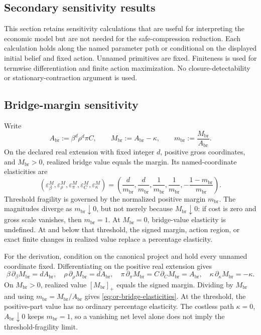 \subsection{Secondary sensitivity results}
\label{or:aor-secondary-comparative-statics}

This section retains sensitivity calculations that are useful for interpreting
the economic model but are not needed for the safe-compression reduction.
Each calculation holds along the named parameter path or conditional on the
displayed initial belief and fixed action. Unnamed primitives are fixed.
Finiteness is used for termwise differentiation and finite action
maximization. No closure-detectability or stationary-contraction argument is
used.

\subsection{Bridge-margin sensitivity}

Write
\begin{equation}
 A_{\mathrm{br}}:=\beta^d\rho^d\pi C,
 \qquad M_{\mathrm{br}}:=A_{\mathrm{br}}-\kappa,
 \qquad m_{\mathrm{br}}:=\frac{M_{\mathrm{br}}}{A_{\mathrm{br}}}.
 \label{eq:or-bridge-margin}
\end{equation}
On the declared real extension with fixed integer \(d\), positive gross
coordinates, and \(M_{\mathrm{br}}>0\), realized bridge value equals the
margin. Its named-coordinate elasticities are
\begin{equation}
 (\varepsilon_\beta^M,\varepsilon_\rho^M,
   \varepsilon_\pi^M,\varepsilon_C^M,\varepsilon_\kappa^M)
 =\left(\frac d{m_{\mathrm{br}}},\frac d{m_{\mathrm{br}}},
   \frac1{m_{\mathrm{br}}},\frac1{m_{\mathrm{br}}},
   -\frac{1-m_{\mathrm{br}}}{m_{\mathrm{br}}}\right).
 \label{eq:or-bridge-elasticities}
\end{equation}
Threshold fragility is governed by the normalized positive margin
\(m_{\mathrm{br}}\). The magnitudes diverge as
\(m_{\mathrm{br}}\downarrow0\), but not merely because
\(M_{\mathrm{br}}\downarrow0\): if cost is zero and gross scale vanishes,
then \(m_{\mathrm{br}}=1\). At \(M_{\mathrm{br}}=0\), bridge-value
elasticity is undefined. At and below that threshold, the signed margin,
action region, or exact finite changes in realized value replace a percentage
elasticity.

For the derivation, condition on the canonical project and hold every unnamed
coordinate fixed. Differentiating on the positive real extension gives
\[
 \beta\,\partial_\beta M_{\mathrm{br}}=dA_{\mathrm{br}},
 \quad
 \rho\,\partial_\rho M_{\mathrm{br}}=dA_{\mathrm{br}},
 \quad
 \pi\,\partial_\pi M_{\mathrm{br}}
 =C\,\partial_C M_{\mathrm{br}}=A_{\mathrm{br}},
 \quad
 \kappa\,\partial_\kappa M_{\mathrm{br}}=-\kappa.
\]
On \(M_{\mathrm{br}}>0\), realized value
\([M_{\mathrm{br}}]_+\) equals the signed margin. Dividing by
\(M_{\mathrm{br}}\) and using
\(m_{\mathrm{br}}=M_{\mathrm{br}}/A_{\mathrm{br}}\) gives
\eqref{eq:or-bridge-elasticities}. At the threshold, the positive-part value
has no ordinary percentage elasticity. The costless path
\(\kappa=0\), \(A_{\mathrm{br}}\downarrow0\) keeps
\(m_{\mathrm{br}}=1\), so a vanishing net level alone does not imply the
threshold-fragility limit.

